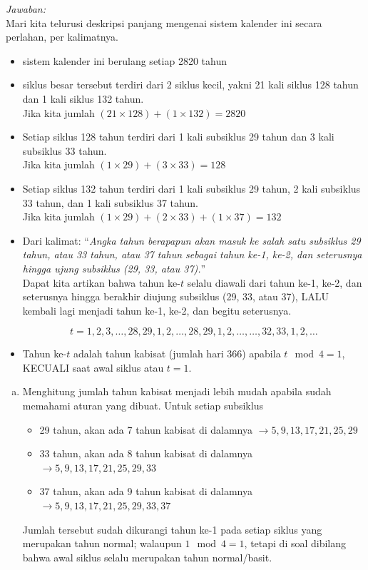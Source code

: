 \documentclass[11pt,fleqn]{exam}
\begin{document}
\begin{questions}
\textit{Jawaban: } \\

Mari kita telurusi deskripsi panjang mengenai sistem kalender ini secara perlahan,  per kalimatnya.
\begin{itemize}
\item sistem kalender ini berulang setiap 2820 tahun
\item siklus besar tersebut terdiri dari 2 siklus kecil, yakni 21 kali siklus 128 tahun dan 1 kali siklus 132 tahun. \\
Jika kita jumlah $(21 \times 128) + (1 \times 132) = 2820$ \checkmark
\item Setiap siklus 128 tahun terdiri dari 1 kali subsiklus 29 tahun dan 3 kali subsiklus 33 tahun. \\
Jika kita jumlah  $(1 \times 29) + (3 \times 33) = 128$ \checkmark
\item Setiap siklus 132 tahun terdiri dari 1 kali subsiklus 29 tahun, 2 kali subsiklus 33 tahun, dan 1 kali subsiklus 37 tahun. \\
Jika kita jumlah  $(1 \times 29) + (2 \times 33) + (1 \times 37) = 132$ \checkmark
\item Dari kalimat: ``\textit{Angka tahun berapapun akan masuk ke salah satu subsiklus 29 tahun, atau 33 tahun, atau 37 tahun sebagai tahun ke-1, ke-2, dan seterusnya hingga ujung subsiklus (29, 33, atau 37).}'' \\
Dapat kita artikan bahwa tahun ke-$t$ selalu diawali dari tahun ke-1, ke-2, dan seterusnya hingga berakhir diujung subsiklus (29, 33, atau 37), LALU kembali lagi menjadi tahun ke-1, ke-2, dan begitu seterusnya.

$$t = 1, 2, 3, \ldots, 28, 29, 1, 2, \ldots, 28, 29, 1, 2, \ldots, \ldots, 32, 33, 1, 2, \ldots$$

\item Tahun ke-$t$ adalah tahun kabisat (jumlah hari 366) apabila $t \mod 4 = 1$, KECUALI saat awal siklus atau $t=1$.
\end{itemize}

\begin{enumerate}[(a)]
\item Menghitung jumlah tahun kabisat menjadi lebih mudah apabila sudah memahami aturan yang dibuat. Untuk setiap subsiklus
\begin{itemize}
\item 29 tahun, akan ada 7 tahun kabisat di dalamnya $\rightarrow 5, 9, 13, 17, 21, 25, 29$
\item 33 tahun, akan ada 8 tahun kabisat di dalamnya $\rightarrow 5, 9, 13, 17, 21, 25, 29, 33$
\item 37 tahun, akan ada 9 tahun kabisat di dalamnya $\rightarrow 5, 9, 13, 17, 21, 25, 29, 33, 37$
\end{itemize}
Jumlah tersebut sudah dikurangi tahun ke-1 pada setiap siklus yang merupakan tahun normal; walaupun $1 \mod 4 = 1$, tetapi di soal dibilang bahwa awal siklus selalu merupakan tahun normal/basit.


\end{enumerate}
\end{questions}
\end{document}
